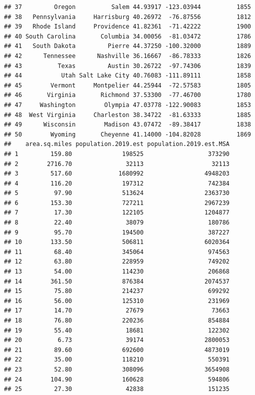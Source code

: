 \documentclass[
]{article}
\begin{document}
\begin{verbatim}
## 37         Oregon          Salem 44.93917 -123.03944          1855
## 38   Pennsylvania     Harrisburg 40.26972  -76.87556          1812
## 39   Rhode Island     Providence 41.82361  -71.42222          1900
## 40 South Carolina       Columbia 34.00056  -81.03472          1786
## 41   South Dakota         Pierre 44.37250 -100.32000          1889
## 42      Tennessee      Nashville 36.16667  -86.78333          1826
## 43          Texas         Austin 30.26722  -97.74306          1839
## 44           Utah Salt Lake City 40.76083 -111.89111          1858
## 45        Vermont     Montpelier 44.25944  -72.57583          1805
## 46       Virginia       Richmond 37.53300  -77.46700          1780
## 47     Washington        Olympia 47.03778 -122.90083          1853
## 48  West Virginia     Charleston 38.34722  -81.63333          1885
## 49      Wisconsin        Madison 43.07472  -89.38417          1838
## 50        Wyoming       Cheyenne 41.14000 -104.82028          1869
##    area.sq.miles population.2019.est population.2019.est.MSA
## 1         159.80              198525                  373290
## 2        2716.70               32113                   32113
## 3         517.60             1680992                 4948203
## 4         116.20              197312                  742384
## 5          97.90              513624                 2363730
## 6         153.30              727211                 2967239
## 7          17.30              122105                 1204877
## 8          22.40               38079                  180786
## 9          95.70              194500                  387227
## 10        133.50              506811                 6020364
## 11         68.40              345064                  974563
## 12         63.80              228959                  749202
## 13         54.00              114230                  206868
## 14        361.50              876384                 2074537
## 15         75.80              214237                  699292
## 16         56.00              125310                  231969
## 17         14.70               27679                   73663
## 18         76.80              220236                  854884
## 19         55.40               18681                  122302
## 20          6.73               39174                 2800053
## 21         89.60              692600                 4873019
## 22         35.00              118210                  550391
## 23         52.80              308096                 3654908
## 24        104.90              160628                  594806
## 25         27.30               42838                  151235

\end{verbatim}
\end{document}
